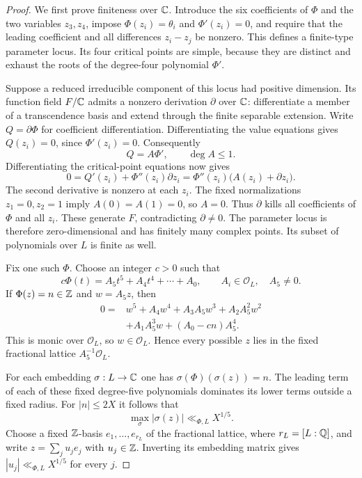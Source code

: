\begin{proof}
We first prove finiteness over $\mathbb C$.  Introduce the six coefficients
of $\Phi$ and the two variables $z_3,z_4$, impose
$\Phi(z_i)=\theta_i$ and $\Phi'(z_i)=0$, and require that the leading
coefficient and all differences $z_i-z_j$ be nonzero.  This defines a
finite-type parameter locus.  Its four critical points are simple,
because they are distinct and exhaust the roots of the degree-four
polynomial $\Phi'$.

Suppose a reduced irreducible component of this locus had positive
dimension.  Its function field $F/\mathbb C$ admits a nonzero derivation
$\partial$ over $\mathbb C$: differentiate a member of a transcendence basis
and extend through the finite separable extension.  Write
$Q=\partial\Phi$ for coefficient differentiation.  Differentiating the
value equations gives $Q(z_i)=0$, since $\Phi'(z_i)=0$.  Consequently
\[
 Q=A\Phi',\qquad\deg A\le1.
\]
Differentiating the critical-point equations now gives
\[
 0=Q'(z_i)+\Phi''(z_i)\partial z_i
   =\Phi''(z_i)\bigl(A(z_i)+\partial z_i\bigr).
\]
The second derivative is nonzero at each $z_i$.  The fixed
normalizations $z_1=0,z_2=1$ imply $A(0)=A(1)=0$, so $A=0$.
Thus $\partial$ kills all coefficients of $\Phi$ and all $z_i$.
These generate $F$, contradicting $\partial\ne0$.  The parameter locus
is therefore zero-dimensional and has finitely many complex points.
Its subset of polynomials over $L$ is finite as well.

Fix one such $\Phi$.  Choose an integer $c>0$ such that
\[
 c\Phi(t)=A_5t^5+A_4t^4+\cdots+A_0,
 \qquad A_i\in\mathcal O_L,\quad A_5\ne0.
\]
If $\Phi(z)=n\in\mathbb Z$ and $w=A_5z$, then
\begin{equation}\label{eq:quintic-integral-input}
 \begin{split}
 0={}&w^5+A_4w^4+A_3A_5w^3+A_2A_5^2w^2\\
     &+A_1A_5^3w+(A_0-cn)A_5^4.
 \end{split}
\end{equation}
This is monic over $\mathcal O_L$, so $w\in\mathcal O_L$.  Hence every
possible $z$ lies in the fixed fractional lattice
$A_5^{-1}\mathcal O_L$.

For each embedding $\sigma:L\to\mathbb C$ one has
$\sigma(\Phi)(\sigma(z))=n$.  The leading term of each of these fixed
degree-five polynomials dominates its lower terms outside a fixed
radius.  For $|n|\le2X$ it follows that
\[
 \max_\sigma|\sigma(z)|\ll_{\Phi,L}X^{1/5}.
\]
Choose a fixed $\mathbb Z$-basis $e_1,\ldots,e_{r_L}$ of the fractional lattice,
where $r_L=[L:\mathbb Q]$, and write $z=\sum_j u_j e_j$ with $u_j\in\mathbb Z$.
Inverting its embedding matrix gives $|u_j|\ll_{\Phi,L}X^{1/5}$ for
every $j$.


\end{proof}
